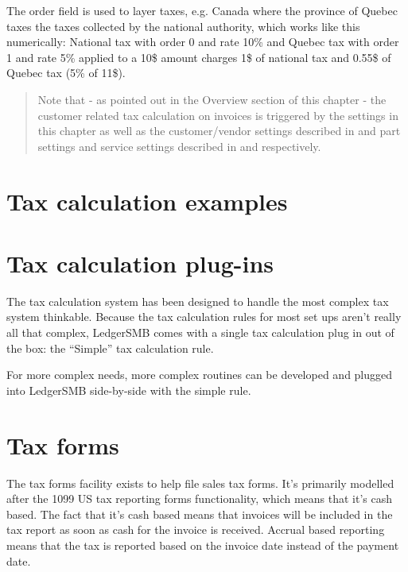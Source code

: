 The order field is used to layer taxes, e.g. Canada where the province of Quebec taxes
the taxes collected by the national authority, which works like this numerically:
National tax with order 0 and rate 10\% and Quebec tax with order 1 and rate 5\%
applied to a 10\$ amount charges 1\$ of national tax and 0.55\$ of Quebec tax (5\% of 11\$).

\begin{quote}
Note that - as pointed out in the Overview section of this chapter - the \gls{customer} related
tax calculation on invoices is triggered by the settings in this chapter as well as
the customer/vendor settings described in 
and part settings and service settings described in  and
 respectively.
\end{quote}

\section{Tax calculation examples}
\label{sec-tax-calculation-examples}


\section{Tax calculation plug-ins}
\label{sec-tax-rule-plugins}

The tax calculation system has been designed to handle the most complex tax system
thinkable. Because the tax calculation rules for most set ups aren't really all that
complex, LedgerSMB comes with a single tax calculation plug in out of the box: the
``Simple'' tax calculation rule.

For more complex needs, more complex routines can be developed and plugged into
LedgerSMB side-by-side with the simple rule.


\section{Tax forms}
\label{sec-tax-taxforms}

The tax forms facility exists to help file sales tax forms. It's primarily modelled
after the 1099 US tax reporting forms functionality, which means that it's cash based.
The fact that it's cash based means that invoices will be included in the tax report
as soon as cash for the invoice is received. Accrual based reporting means that the
tax is reported based on the invoice date instead of the payment date.

